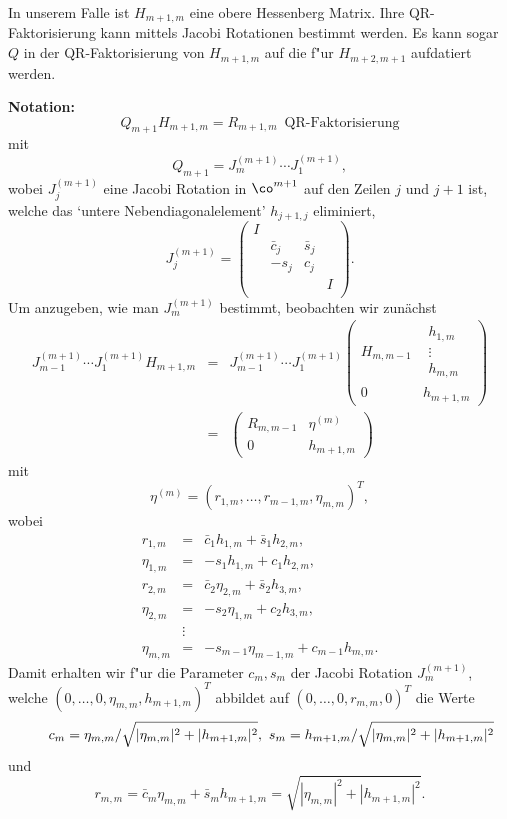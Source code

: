 In unserem Falle ist $H_{m+1,m}$ eine obere Hessenberg Matrix. Ihre QR-Fak\-to\-ri\-sierung
kann mittels Jacobi Rotationen bestimmt werden. Es kann sogar $Q$ in der
QR-Faktorisierung von $H_{m+1,m}$ auf die f"ur $H_{m+2,m+1}$ aufdatiert werden.

\bigskip

{\bf Notation:}
\[
Q_{m+1} H_{m+1,m} = R_{m+1,m} \enspace \mbox{QR-Faktorisierung}
\]
mit
\[
Q_{m+1} = J_m^{(m+1)}\cdots J_1^{(m+1)},
\]
wobei $J_j^{(m+1)}$ eine Jacobi Rotation in $\co^{m+1}$ auf den Zeilen $j$
und $j+1$ ist, welche das `untere Nebendiagonalelement' $h_{j+1,j}$ eliminiert,
\[
J_j^{(m+1)} = \left(%
\begin{array}{cccc}
  I &  &  &  \\
   & \bar{c}_j & \bar{s}_j &  \\
   & -s_j & c_j &  \\
   &  &  & I \\
\end{array}%
\right).
\]
Um anzugeben, wie man $J_m^{(m+1)}$ bestimmt, beobachten wir zun\"achst
\begin{eqnarray*}
J_{m-1}^{(m+1)} \cdots J_1^{(m+1)} H_{m+1,m} &=& J_{m-1}^{(m+1)} \cdots J_1^{(m+1)}
    \left(\begin{array}{c|c} 
  H_{m,m-1}& \begin{array}{c}
           h_{1,m} \\
  \vdots \\
h_{m,m}
  \end{array}\\
\hline
  0         & h_{m+1,m}
  \end{array}
 \right) \\
&=&
    \left( \begin{array}{cc}
  R_{m,m-1} & \eta^{(m)} \\
  0         & h_{m+1,m}
  \end{array}
 \right)
\end{eqnarray*}
mit
\[
\eta^{(m)} = (r_{1,m},\ldots,r_{m-1,m},\eta_{m,m})^T,
\]
wobei
\begin{eqnarray*}
r_{1,m} &=& \bar{c}_1h_{1,m} + \bar{s}_1h_{2,m}, \\
\eta_{1,m} &=& -s_1h_{1,m} + c_1h_{2,m}, \\
r_{2,m} &=& \bar{c}_2\eta_{2,m} + \bar{s}_2h_{3,m}, \\
\eta_{2,m} &=& -s_2\eta_{1,m} + c_2h_{3,m}, \\
& \vdots & \\
\eta_{m,m} &=& -s_{m-1}\eta_{m-1,m} + c_{m-1}h_{m,m} .
\end{eqnarray*}
Damit erhalten wir f"ur die Parameter $c_m,s_m$ der Jacobi Rotation
$J^{(m+1)}_m$, welche $(0,\ldots,0,\eta_{m,m},h_{m+1,m})^T$ abbildet auf
$(0,\ldots,0,r_{m,m},0)^T$ die Werte 
\begin{equation} \label{rotparam_eq}
  c_m = \eta_{m,m}/\sqrt{|\eta_{m,m}|^2 + |h_{m+1,m}|^2}, \
s_m = h_{m+1,m}/\sqrt{|\eta_{m,m}|^2 + |h_{m+1,m}|^2}  \hspace*{-0.6cm}
\end{equation}
und
\[
r_{m,m} = \bar{c}_m\eta_{m,m} + \bar{s}_mh_{m+1,m} = \sqrt{|\eta_{m,m}|^2 + |h_{m+1,m}|^2} .
\]

